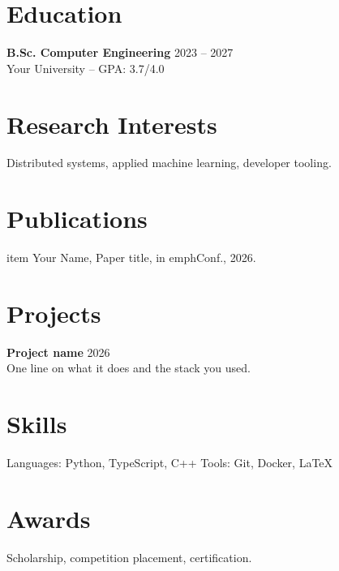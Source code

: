 \documentclass[10pt]{article}
\date{}
\begin{document}
\maketitle

\section{Education}
\textbf{B.Sc. Computer Engineering} \hfill 2023 -- 2027 \\
Your University -- GPA: 3.7/4.0

\section{Research Interests}
Distributed systems, applied machine learning, developer tooling.

\section{Publications}
\begin{itemize}[leftmargin=*,nosep]
  item Your Name, Paper title, in emph{Conf.}, 2026.
\end{itemize}

\section{Projects}
\textbf{Project name} \hfill 2026 \\
One line on what it does and the stack you used.

\section{Skills}
Languages: Python, TypeScript, C++ \quad Tools: Git, Docker, LaTeX

\section{Awards}
Scholarship, competition placement, certification.
\end{document}
